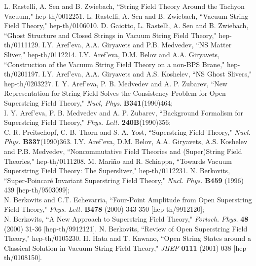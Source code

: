 \documentclass[a4paper,12pt]{article}
\begin{document}
\begin{thebibliography}{999}
L. Rastelli, A. Sen and B. Zwiebach, ``String Field Theory Around the 
 Tachyon Vacuum," hep-th/0012251.
L. Rastelli, A. Sen and B. Zwiebach, ``Vacuum String Field Theory," hep-th/0106010. 
D. Gaiotto, L. Rastelli, A. Sen and B. Zwiebach, ``Ghost Structure and Closed Strings 
 in Vacuum String Field Theory," hep-th/0111129. 
I.Y. Aref'eva, A.A. Giryavets and P.B. Medvedev, ``NS Matter Sliver," hep-th/0112214. 
I.Y. Aref'eva, D.M. Belov and A.A. Giryavets, ``Construction of the Vacuum String Field Theory 
 on a non-BPS Brane," hep-th/0201197. 
I.Y. Aref'eva, A.A. Giryavets and A.S. Koshelev, ``NS Ghost Slivers," hep-th/0203227. 
 I. Y. Aref'eva, P. B. Medvedev and A. P. Zubarev, ``New 
 Representation for String Field Solves the Consistency 
 Problem for Open Superstring Field Theory," 
 \textit{Nucl, Phys. } \textbf{B341}(1990)464; \vspace{2mm} \\
 I. Y. Aref'eva, P. B. Medvedev and A. P. Zubarev, 
 ``Background Formalism for Superstring Field Theory," 
 \textit{Phys. Lett. } \textbf{240B}(1990)356; \vspace{2mm} \\
 C. R. Preitschopf, C. B. Thorn and S. A. Yost, ``Superstring Field Theory," 
 \textit{Nucl. Phys. } \textbf{B337}(1990)363.
I.Y. Aref'eva, D.M. Belov, A.A. Giryavets, A.S. Koshelev and P.B. Medvedev, ``Noncommutative 
 Field Theories and (Super)String Field Theories," hep-th/0111208.
M. Mari\~{n}o and R. Schiappa, ``Towards Vacuum Superstring Field Theory: The Supersliver," 
 hep-th/0112231.
N. Berkovits, ``Super-Poincar\'{e} Invariant Superstring Field Theory," 
 \textit{Nucl. Phys.} \textbf{B459} (1996) 439 [hep-th/9503099]; \vspace{2mm} \\
 N. Berkovits and C.T. Echevarria, ``Four-Point Amplitude from Open Superstring 
 Field Theory," \textit{Phys. Lett.} \textbf{B478} (2000) 343-350 [hep-th/9912120]; \vspace{2mm} \\
 N. Berkovits, ``A New Approach to Superstring Field Theory," \textit{Fortsch. Phys.} 
 \textbf{48} (2000) 31-36 [hep-th/9912121].
N. Berkovits, ``Review of Open Superstring Field Theory," hep-th/0105230.
H. Hata and T. Kawano, ``Open String States around a Classical Solution in 
 Vacuum String Field Theory," \textit{JHEP} \textbf{0111} (2001) 038 [hep-th/0108150].

\end{thebibliography}
\end{document}
